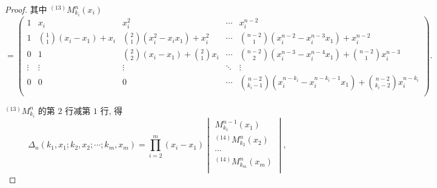\documentclass[color=black,device=normal,lang=cn,mode=geye]{elegantnote}
\begin{document}
\begin{landscape}
\begin{proof}
    其中 $^{(13)}M_{k_i}^n(x_i)$
    \[=\begin{pmatrix}
        1 & x_i & x_i^2 & \cdots & x_i^{n-2} \\[4pt]
        1 & \binom{1}{1}(x_i-x_1)+x_i & \binom{2}{1}(x_i^2-x_ix_1)+x_i^2 & \cdots & \binom{n-2}{1}(x_i^{n-2}-x_i^{n-3}x_1)+x_i^{n-2} \\[10pt]
        0 & 1 & \binom{2}{2}(x_i-x_1)+\binom{2}{1}x_i & \cdots & \binom{n-2}{2}(x_i^{n-3}-x_i^{n-4}x_1)+\binom{n-2}{1}x_i^{n-3} \\
        \vdots & \vdots & \vdots & \ddots & \vdots \\[4pt]
        0 & 0 & 0 & \cdots & \binom{n-2}{k_i-1}(x_i^{n-k_i}-x_i^{n-k_i-1}x_1)+\binom{n-2}{k_i-2}x_i^{n-k_i} \\
    \end{pmatrix}.\]

    $^{(13)}M_{k_i}^n$ 的第 $2$ 行减第 $1$ 行, 得
    \[\Delta_n(k_1,x_1;k_2,x_2;\cdots;k_m,x_m)=\prod\limits_{i=2}^m(x_i-x_1)\begin{vmatrix}
        M_{k_1}^{n-1}(x_1) \\
        ^{(14)}M_{k_2}^n(x_2) \\
        \cdots \\
        ^{(14)}M_{k_m}^n(x_m) \\
    \end{vmatrix},\]


\end{proof}
\end{landscape}
\end{document}
